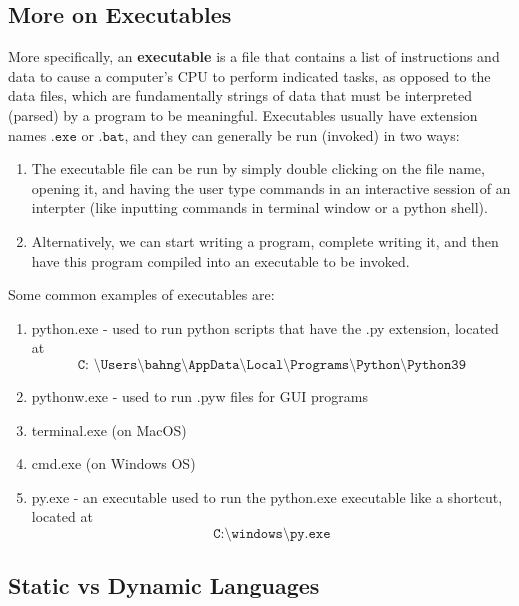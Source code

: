\subsection{More on Executables}

  More specifically, an \textbf{executable} is a file that contains a list of instructions and data to cause a computer's CPU to perform indicated tasks, as opposed to the data files, which are fundamentally strings of data that must be interpreted (parsed) by a program to be meaningful. Executables usually have extension names $\texttt{.exe}$ or $\texttt{.bat}$, and they can generally be run (invoked) in two ways: 
  \begin{enumerate}
      \item The executable file can be run by simply double clicking on the file name, opening it, and having the user type commands in an interactive session of an interpter (like inputting commands in terminal window or a python shell).
      \item Alternatively, we can start writing a program, complete writing it, and then have this program compiled into an executable to be invoked.
  \end{enumerate}
  Some common examples of executables are:
  \begin{enumerate}
      \item python.exe - used to run python scripts that have the .py extension, located at 
      \[\texttt{C: \textbackslash Users\textbackslash bahng\textbackslash AppData\textbackslash Local\textbackslash Programs\textbackslash Python\textbackslash Python39}\]
      \item pythonw.exe - used to run .pyw files for GUI programs
      \item terminal.exe (on MacOS)
      \item cmd.exe (on Windows OS)
      \item py.exe - an executable used to run the python.exe executable like a shortcut, located at 
      \[\texttt{C:\textbackslash windows\textbackslash py.exe}\]
  \end{enumerate}

\subsection{Static vs Dynamic Languages}

